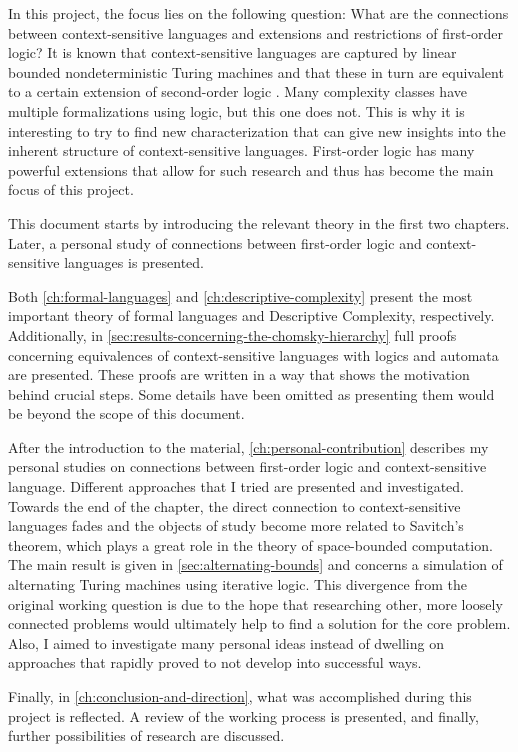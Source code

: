 In this project, the focus lies on the following question: What are the connections between context-sensitive languages and extensions and restrictions of first-order logic?
It is known that context-sensitive languages are captured by linear bounded nondeterministic Turing machines and that these in turn are equivalent to a certain extension of second-order logic \cite{descriptive-complexity}.
Many complexity classes have multiple formalizations using logic, but this one does not.
This is why it is interesting to try to find new characterization that can give new insights into the inherent structure of context-sensitive languages.
First-order logic has many powerful extensions that allow for such research and thus has become the main focus of this project.

This document starts by introducing the relevant theory in the first two chapters.
Later, a personal study of connections between first-order logic and context-sensitive languages is presented.

Both \cref{ch:formal-languages} and \cref{ch:descriptive-complexity} present the most important theory of formal languages and Descriptive Complexity, respectively.
Additionally, in \cref{sec:results-concerning-the-chomsky-hierarchy} full proofs concerning equivalences of context-sensitive languages with logics and automata are presented.
These proofs are written in a way that shows the motivation behind crucial steps.
Some details have been omitted as presenting them would be beyond the scope of this document.

After the introduction to the material, \cref{ch:personal-contribution} describes my personal studies on connections between first-order logic and context-sensitive language.
Different approaches that I tried are presented and investigated.
Towards the end of the chapter, the direct connection to context-sensitive languages fades and the objects of study become more related to Savitch's theorem, which plays a great role in the theory of space-bounded computation.
The main result is given in \cref{sec:alternating-bounds} and concerns a simulation of alternating Turing machines using iterative logic.
This divergence from the original working question is due to the hope that researching other, more loosely connected problems would ultimately help to find a solution for the core problem.
Also, I aimed to investigate many personal ideas instead of dwelling on approaches that rapidly proved to not develop into successful ways.

Finally, in \cref{ch:conclusion-and-direction}, what was accomplished during this project is reflected.
A review of the working process is presented, and finally, further possibilities of research are discussed.

